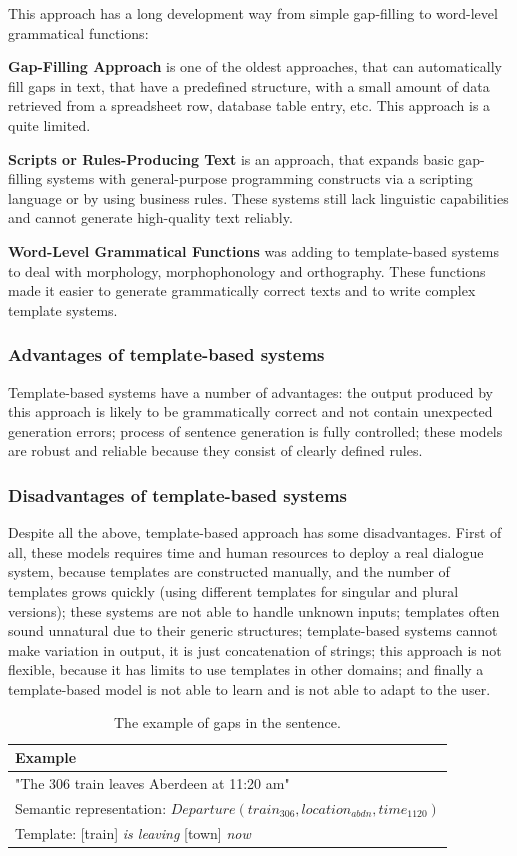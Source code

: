 This approach has a long development way from simple gap-filling to word-level grammatical functions:

\textbf{Gap-Filling Approach} is one of the oldest approaches, that can automatically fill gaps in text, that have a predefined structure, with a small amount of data retrieved from a spreadsheet row, database table entry, etc. This approach is a quite limited.

\textbf{Scripts or Rules-Producing Text} is an approach, that expands basic gap-filling systems with general-purpose programming constructs via a scripting language or by using business rules. These systems still lack linguistic capabilities and cannot generate high-quality text reliably.

\textbf{Word-Level Grammatical Functions} was adding to template-based systems to deal with morphology, morphophonology and orthography. These functions made it easier to generate grammatically correct texts and to write complex template systems.

\subsubsection{Advantages of template-based systems}
Template-based systems have a number of advantages: the output produced by this approach is likely to be grammatically correct and not contain unexpected generation errors; process of sentence generation is fully controlled; these models are robust and reliable because they consist of clearly defined rules.

\subsubsection{Disadvantages of template-based systems}
Despite all the above, template-based approach has some disadvantages. First of all, these models requires time and human resources to deploy a real dialogue system, because templates are constructed manually, and the number of templates grows quickly (using different templates for singular and plural versions); these systems are not able to handle unknown inputs; templates often sound unnatural due to their generic structures; template-based systems cannot make variation in output, it is just concatenation of strings; this approach is not flexible, because it has limits to use templates in other domains; and finally a template-based model is not able to learn and is not able to adapt to the user.

\begin{table}[t]
\centering
 \begin{tabular}{|p{8cm}|} 
 \hline
 Example \\
 \hline
 "The 306 train leaves Aberdeen at 11:20 am" \\ 
 \hline
 Semantic representation: 
 $Departure(train_{306}, location_{abdn}, time_{1120})$ \\
 \hline
 Template: 
 [train] \textit{is leaving} [town] \textit{now} \\
 \hline
 \end{tabular}
 \caption{The example of gaps in the sentence.}
\label{tab:tb_example}
\end{table}

